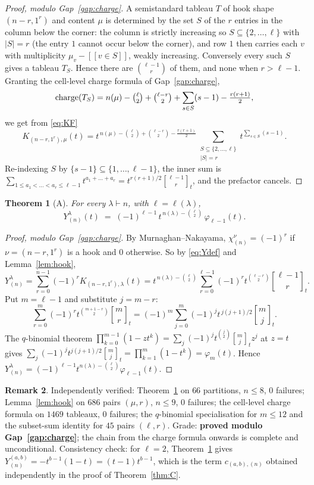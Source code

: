 \documentclass[11pt]{article}
\theoremstyle{plain}
\newtheorem{theorem}{Theorem}
\theoremstyle{definition}
\newtheorem{remark}[theorem]{Remark}
\DeclareMathOperator{\ch}{charge}
\newcommand{\lam}{\lambda}
\newcommand{\qbin}[2]{\genfrac{[}{]}{0pt}{}{#1}{#2}_{t}}
\newcommand{\lb}{[\![}
\newcommand{\rb}{]\!]}
\begin{document}
\begin{proof}[Proof, modulo Gap~\ref{gap:charge}]
A semistandard tableau $T$ of hook shape $(n-r,1^r)$ and content $\mu$ is determined by the set
$S$ of the $r$ entries in the column below the corner: the column is strictly increasing so
$S\subseteq\{2,\dots,\ell\}$ with $|S|=r$ (the entry $1$ cannot occur below the corner), and row
$1$ then carries each $v$ with multiplicity $\mu_v-\lb v\in S\rb$, weakly increasing. Conversely
every such $S$ gives a tableau $T_S$. Hence there are $\binom{\ell-1}{r}$ of them, and none when
$r>\ell-1$. Granting the cell-level charge formula of Gap~\ref{gap:charge},
\[
  \ch(T_S)=n(\mu)-\tbinom{\ell}{2}+\tbinom{\ell-r}{2}+\sum_{s\in S}(s-1)-\tfrac{r(r+1)}{2},
\]
we get from \eqref{eq:KF}
\[
  K_{(n-r,1^r),\mu}(t)=t^{\,n(\mu)-\binom{\ell}{2}+\binom{\ell-r}{2}-\frac{r(r+1)}{2}}
  \sum_{\substack{S\subseteq\{2,\dots,\ell\}\\ |S|=r}} t^{\sum_{s\in S}(s-1)} .
\]
Re-indexing $S$ by $\{s-1\}\subseteq\{1,\dots,\ell-1\}$, the inner sum is
$\sum_{1\le a_1<\dots<a_r\le \ell-1}t^{a_1+\dots+a_r}=t^{r(r+1)/2}\qbin{\ell-1}{r}$, and the
prefactor cancels.
\end{proof}

\begin{theorem}[A]\label{thm:A}
For every $\lam\vdash n$, with $\ell=\ell(\lam)$,
\[
  Y^{\lam}_{(n)}(t)\;=\;(-1)^{\ell-1}\,t^{\,n(\lam)-\binom{\ell}{2}}\,\varphi_{\ell-1}(t).
\]
\end{theorem}

\begin{proof}[Proof, modulo Gap~\ref{gap:charge}]
By Murnaghan--Nakayama, $\chi^{\nu}_{(n)}=(-1)^r$ if $\nu=(n-r,1^r)$ is a hook and $0$ otherwise.
So by \eqref{eq:Ydef} and Lemma~\ref{lem:hook},
\[
  Y^{\lam}_{(n)}=\sum_{r=0}^{n-1}(-1)^rK_{(n-r,1^r),\lam}(t)
  =t^{\,n(\lam)-\binom{\ell}{2}}\sum_{r=0}^{\ell-1}(-1)^r t^{\binom{\ell-r}{2}}\qbin{\ell-1}{r}.
\]
Put $m=\ell-1$ and substitute $j=m-r$:
\[
  \sum_{r=0}^{m}(-1)^rt^{\binom{m+1-r}{2}}\qbin{m}{r}
  =(-1)^m\sum_{j=0}^{m}(-1)^{j}t^{\,j(j+1)/2}\qbin{m}{j}.
\]
The $q$-binomial theorem $\prod_{k=0}^{m-1}(1-zt^{k})=\sum_{j}(-1)^jt^{\binom{j}{2}}\qbin{m}{j}z^j$
at $z=t$ gives $\sum_{j}(-1)^jt^{j(j+1)/2}\qbin{m}{j}=\prod_{k=1}^{m}(1-t^{k})=\varphi_m(t)$.
Hence $Y^{\lam}_{(n)}=(-1)^{\ell-1}t^{n(\lam)-\binom{\ell}{2}}\varphi_{\ell-1}(t)$.
\end{proof}

\begin{remark}
Independently verified: Theorem~\ref{thm:A} on $66$ partitions, $n\le 8$, $0$ failures;
Lemma~\ref{lem:hook} on $686$ pairs $(\mu,r)$, $n\le 9$, $0$ failures; the cell-level charge
formula on $1469$ tableaux, $0$ failures; the $q$-binomial specialisation for $m\le 12$ and the
subset-sum identity for $45$ pairs $(\ell,r)$. Grade: \textbf{proved modulo
Gap~\ref{gap:charge}}; the chain from the charge formula onwards is complete and unconditional.
Consistency check: for $\ell=2$, Theorem~\ref{thm:A} gives
$Y^{(a,b)}_{(n)}=-t^{b-1}(1-t)=(t-1)t^{b-1}$, which is the term $c_{(a,b),(n)}$ obtained
independently in the proof of Theorem~\ref{thm:C}.
\end{remark}
\end{document}
